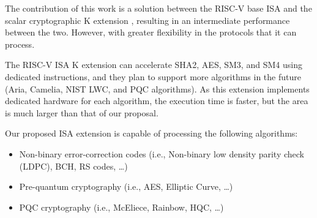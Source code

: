 The contribution of this work is a solution between the RISC-V base ISA and the scalar cryptographic K extension \cite{zehrisc}, resulting in an 
intermediate performance between the two. However, with greater flexibility in the protocols that it can process. 

The RISC-V ISA K extension can accelerate SHA2, AES, SM3, and SM4 using dedicated instructions, and they plan to support more algorithms 
in the future (Aria, Camelia, NIST LWC, and PQC algorithms). As this extension implements dedicated hardware for each algorithm, the execution time is faster, but the area is much larger than that of our proposal.

Our proposed ISA extension is capable of processing the following algorithms:

\begin{itemize}
    \item Non-binary error-correction codes (i.e., Non-binary low density parity check (LDPC), BCH, RS codes, \dots)
    \item Pre-quantum cryptography (i.e., AES, Elliptic Curve, \dots)
    \item PQC cryptography (i.e., McEliece, Rainbow, HQC, \dots)
\end{itemize}


